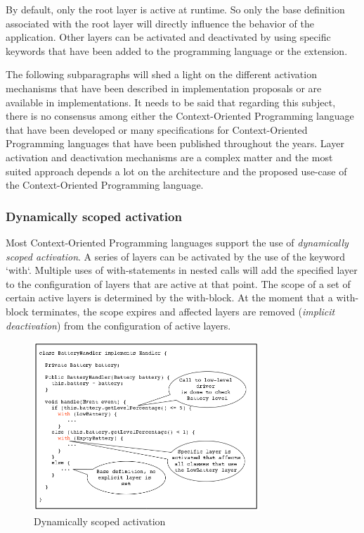 \documentclass{acm_proc_article-sp}
\begin{document}
By default, only the root layer is active at runtime. So only the base definition associated with the root layer will directly influence the behavior of the application. Other layers can be activated and deactivated by using specific keywords that have been added to the programming language or the extension. 

The following subparagraphs will shed a light on the different activation mechanisms that have been described in implementation proposals or are available in implementations. It needs to be said that regarding this subject, there is no consensus among either the Context-Oriented Programming language that have been developed or many specifications for Context-Oriented Programming languages that have been published throughout the years. Layer activation and deactivation mechanisms are a complex matter and the most suited approach depends a lot on the architecture and the proposed use-case of the Context-Oriented Programming language.

\subsubsection{Dynamically scoped activation}
\label{dynamically_scoped_activation}
Most Context-Oriented Programming languages support the use of \textit{dynamically scoped activation}. A series of layers can be activated by the use of the keyword `with`. Multiple uses of with-statements in nested calls will add the specified layer to the configuration of layers that are active at that point. The scope of a set of certain active layers is determined by the with-block. At the moment that a with-block terminates, the scope expires and affected layers are removed (\textit{implicit deactivation}) from the configuration of active layers. 

\begin{figure}[H]
\centering
\includegraphics[width=85mm]{dynamic_activation_toy.png}
\caption{Dynamically scoped activation}
\label{fig:dynamically_scoped_activation}
\end{figure}
\end{document}
